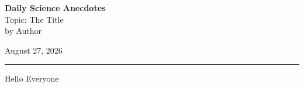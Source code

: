 \documentclass[14pt, a4paper]{extarticle}
\newcommand{\docTopic}{The Title}
\newcommand{\docAuthor}{Author}
\newcommand{\docDate}{August 27, 2026}
\begin{document}
\noindent
\begin{minipage}[b]{0.6\textwidth}
    {\fontsize{22pt}{26pt}\selectfont \textbf{Daily Science Anecdotes}}\\[4pt]
    {\fontsize{18pt}{22pt}\selectfont Topic: \docTopic}\\[4pt]
    {\fontsize{16pt}{20pt}\selectfont by \docAuthor}
\end{minipage}%
\hfill
\begin{minipage}[b]{0.35\textwidth}
    \raggedleft
    {\fontsize{18pt}{22pt}\selectfont \docDate}
\end{minipage}

\vspace{8pt}
\hrule
\vspace{12pt}

Hello Everyone
\end{document}
